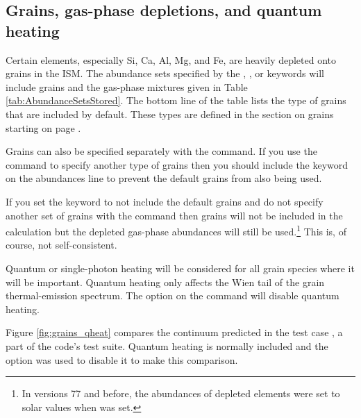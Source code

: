 \subsection{Grains, gas-phase depletions, and quantum heating}

Certain elements, especially Si, Ca, Al, Mg, and Fe,
are heavily depleted
onto grains in the ISM.
The abundance sets specified by the
,
, or  keywords
will include grains and the gas-phase
mixtures given in Table \ref{tab:AbundanceSetsStored}.
The bottom line of the table lists the type
of grains that are included by default.
These types are defined in the section on grains
starting on page \pageref{sec:GrainsCommand}.

Grains can also be specified separately with the
 command.
If you use the  command to specify another type
of grains then you should include the keyword
 on the abundances
line to prevent the default grains from also being used.

If you set the keyword  to not include
the default grains and
do not specify another set of grains with the
 command then grains
will not be included in the calculation but the depleted
gas-phase abundances
will still be used.\footnote{In versions 77 and before,
the abundances of depleted elements were
set to solar values when  was set.}
This is, of course, not self-consistent.

Quantum or single-photon heating will be considered for all
grain species where it will be important.
Quantum heating only affects the Wien tail of the grain
thermal-emission spectrum.
The  option on the  command
will disable quantum heating.

Figure \ref{fig:grains_qheat} compares the continuum predicted
in the test case ,
a part of the code's test suite.
Quantum heating is normally
included and the  option was used to
disable it to make this comparison.

